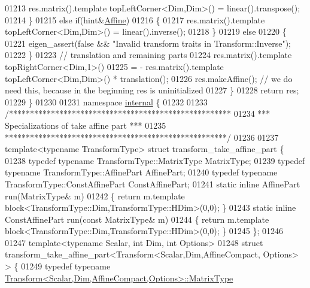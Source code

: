 \begin{DoxyCode}
01213       res.matrix().template topLeftCorner<Dim,Dim>() = linear().transpose();
01214     \}
01215     \textcolor{keywordflow}{else} \textcolor{keywordflow}{if}(hint&\hyperlink{group__enums_ggaee59a86102f150923b0cac6d4ff05107a71e768e0581725d919d0b05f4cb83234}{Affine})
01216     \{
01217       res.matrix().template topLeftCorner<Dim,Dim>() = linear().inverse();
01218     \}
01219     \textcolor{keywordflow}{else}
01220     \{
01221       eigen\_assert(\textcolor{keyword}{false} && \textcolor{stringliteral}{"Invalid transform traits in Transform::Inverse"});
01222     \}
01223     \textcolor{comment}{// translation and remaining parts}
01224     res.matrix().template topRightCorner<Dim,1>()
01225       = - res.matrix().template topLeftCorner<Dim,Dim>() * translation();
01226     res.makeAffine(); \textcolor{comment}{// we do need this, because in the beginning res is uninitialized}
01227   \}
01228   \textcolor{keywordflow}{return} res;
01229 \}
01230 
01231 \textcolor{keyword}{namespace }\hyperlink{namespaceinternal}{internal} \{
01232 
01233 \textcolor{comment}{/*****************************************************}
01234 \textcolor{comment}{*** Specializations of take affine part            ***}
01235 \textcolor{comment}{*****************************************************/}
01236 
01237 \textcolor{keyword}{template}<\textcolor{keyword}{typename} TransformType> \textcolor{keyword}{struct }transform\_take\_affine\_part \{
01238   \textcolor{keyword}{typedef} \textcolor{keyword}{typename} TransformType::MatrixType MatrixType;
01239   \textcolor{keyword}{typedef} \textcolor{keyword}{typename} TransformType::AffinePart AffinePart;
01240   \textcolor{keyword}{typedef} \textcolor{keyword}{typename} TransformType::ConstAffinePart ConstAffinePart;
01241   \textcolor{keyword}{static} \textcolor{keyword}{inline} AffinePart run(MatrixType& m)
01242   \{ \textcolor{keywordflow}{return} m.template block<TransformType::Dim,TransformType::HDim>(0,0); \}
01243   \textcolor{keyword}{static} \textcolor{keyword}{inline} ConstAffinePart run(\textcolor{keyword}{const} MatrixType& m)
01244   \{ \textcolor{keywordflow}{return} m.template block<TransformType::Dim,TransformType::HDim>(0,0); \}
01245 \};
01246 
01247 \textcolor{keyword}{template}<\textcolor{keyword}{typename} Scalar, \textcolor{keywordtype}{int} Dim, \textcolor{keywordtype}{int} Options>
01248 \textcolor{keyword}{struct }transform\_take\_affine\_part<Transform<Scalar,Dim,AffineCompact, Options> > \{
01249   \textcolor{keyword}{typedef} \textcolor{keyword}{typename} \hyperlink{group___core___module_class_eigen_1_1_matrix}{Transform<Scalar,Dim,AffineCompact,Options>::MatrixType}

\end{DoxyCode}
